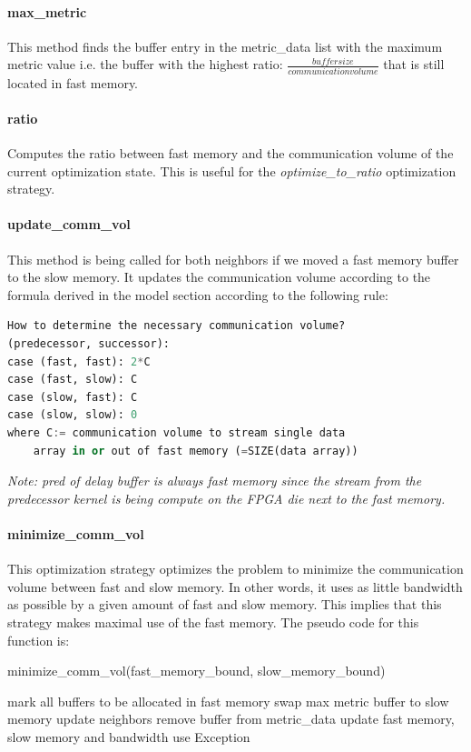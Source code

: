 \paragraph{max\_metric}
This method finds the buffer entry in the metric\_data list with the maximum metric value i.e. the buffer with the highest ratio: $\frac{buffer size}{communication volume}$ that is still located in fast memory.


\paragraph{ratio}
Computes the ratio between fast memory and the communication volume of the current optimization state. This is useful for the \textit{optimize\_to\_ratio} optimization strategy.


\paragraph{update\_comm\_vol}
This method is being called for both neighbors if we moved a fast memory buffer to the slow memory. It updates the communication volume according to the formula derived in the model section according to the following rule:
\begin{lstlisting}[showstringspaces=false, frame=single, language=Python]
How to determine the necessary communication volume?
(predecessor, successor):
case (fast, fast): 2*C
case (fast, slow): C
case (slow, fast): C
case (slow, slow): 0
where C:= communication volume to stream single data
    array in or out of fast memory (=SIZE(data array))
\end{lstlisting}
\textit{Note: pred of delay buffer is always fast memory since the stream from the predecessor kernel is being compute on the FPGA die next to the fast memory.}


\paragraph{minimize\_comm\_vol}
This optimization strategy optimizes the problem to minimize the communication volume between fast and slow memory. In other words, it uses as little bandwidth as possible by a given amount of fast and slow memory. This implies that this strategy makes maximal use of the fast memory. The pseudo code for this function is:
\begin{algorithm}
	\caption{minimize\_comm\_vol(fast\_memory\_bound, slow\_memory\_bound)}
	\begin{algorithmic}
		\STATE mark all buffers to be allocated in fast memory
		\STATE swap max metric buffer to slow memory
		\STATE update neighbors
		\STATE remove buffer from metric\_data
		\STATE update fast memory, slow memory and bandwidth use
		\STATE Exception
		\ENDIF
		\ENDWHILE
	\end{algorithmic}
\end{algorithm}

